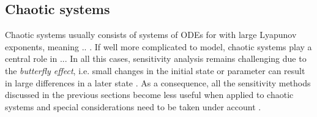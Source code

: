 




\subsection{Chaotic systems}



Chaotic systems usually consists of systems of ODEs for with large Lyapunov exponents, meaning .. .
If well more complicated to model, chaotic systems play a central role in ... 
In all this cases, sensitivity analysis remains challenging due to the \textit{butterfly effect}, i.e. small changes in the initial state or parameter can result in large differences in a later state \cite{Lorenz.1963}.
As a consequence, all the sensitivity methods discussed in the previous sections become less useful when applied to chaotic systems and special considerations need to be taken under account \cite{Wang2012-chaos-adjoint}.

